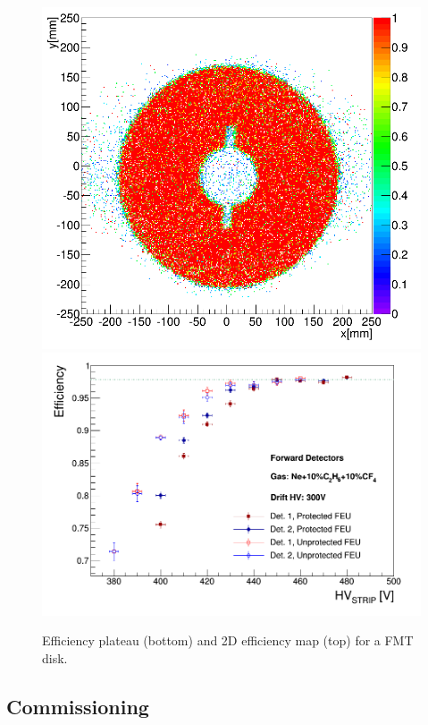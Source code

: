 \begin{figure}[htb]
 \includegraphics[width=1.0\columnwidth,keepaspectratio]{images/FMT_eff_2Dmap_testBench.png}
 \includegraphics[width=1.0\columnwidth,keepaspectratio]{images/FMT_eff_plateau_testBench.png}
 \caption{Efficiency plateau (bottom) and 2D efficiency map (top) for a FMT disk.}
 \label{fig:mm-fig9}
\end{figure}

\subsection{Commissioning}

